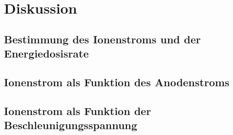 \section{Diskussion}
\label{sec:Diskussion}

\subsection{Bestimmung des Ionenstroms und der Energiedosisrate}


\subsection{Ionenstrom als Funktion des Anodenstroms}

\subsection{Ionenstrom als Funktion der Beschleunigungsspannung}
